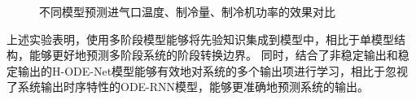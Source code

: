 \begin{figure}
\caption{不同模型预测进气口温度、制冷量、制冷机功率的效果对比} %
\label{fig:4_models}  %
\end{figure}
上述实验表明，使用多阶段模型能够将先验知识集成到模型中，相比于单模型结构，能够更好地预测多阶段系统的阶段转换边界。
同时，结合了非稳定输出和稳定输出的H-ODE-Net模型能够有效地对系统的多个输出项进行学习，相比于忽视了系统输出时序特性的ODE-RNN模型，能够更准确地预测系统的输出。

